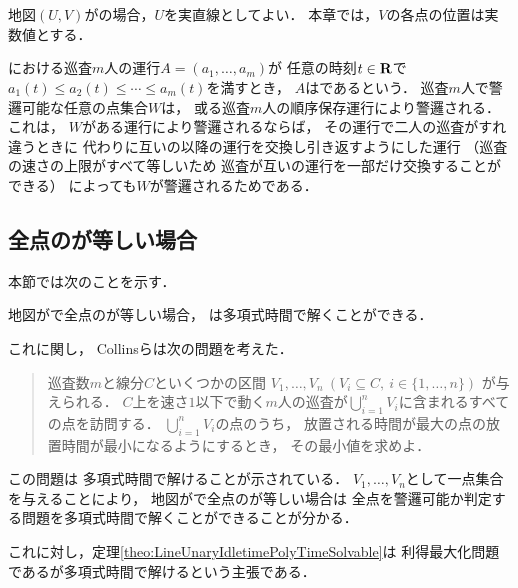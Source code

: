 \chapter{{\graphLine}}
\label{chapter: line}

地図$(U, V)$が{\graphLine}の場合，$U$を実直線としてよい．
本章では，$V$の各点の位置は実数値とする．

{\graphLine}における巡査$m$人の運行$A = (a_1, \ldots, a_m)$が
任意の時刻$t \in \mathbf R$で
$a_1(t) \leq a_2(t) \leq \cdots \leq a_m(t)$を満すとき，
$A$はであるという．
巡査$m$人で警邏可能な任意の点集合$W$は，
或る巡査$m$人の順序保存運行により警邏される．
これは，
$W$がある運行により警邏されるならば，
その運行で二人の巡査がすれ違うときに
代わりに互いの以降の運行を交換し引き返すようにした運行
（巡査の速さの上限がすべて等しいため
巡査が互いの運行を一部だけ交換することができる）
によっても$W$が警邏されるためである．


\section{全点の{\maxIdletime}が等しい場合}
\label{section:LineUnaryIdletime}


本節では次のことを示す．

\begin{theo}
  \label{theo:LineUnaryIdletimePolyTimeSolvable}
  地図が{\graphLine}で全点の{\maxIdletime}が等しい場合，
  {\patProb}は多項式時間で解くことができる．
\end{theo}

これに関し，
Collinsら\cite{collins2013optimal}は次の問題を考えた．
\begin{quote}
  巡査数$m$と線分$C$といくつかの区間
  $V_1, \ldots, V_n\ (V_i \subseteq C,\ i \in \{1,\ldots, n\})$%
  が与えられる．
  $C$上を速さ$1$以下で動く$m$人の巡査が$\bigcup_{i = 1}^n V_i$に含まれるすべての点を訪問する．
  $\bigcup_{i = 1}^n V_i$の点のうち，
  放置される時間が最大の点の放置時間が最小になるようにするとき，
  その最小値を求めよ．
\end{quote}
この問題は
多項式時間で解けることが示されている\cite[Theorem~2.1]{collins2013optimal}．
$V_1, \ldots, V_n$として一点集合を与えることにより，
地図が{\graphLine}で全点の{\maxIdletime}が等しい場合は
全点を警邏可能か判定する問題を多項式時間で解くことができることが分かる．

これに対し，定理\ref{theo:LineUnaryIdletimePolyTimeSolvable}は
利得最大化問題である{\patProb}が多項式時間で解けるという主張である．

